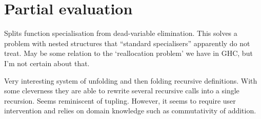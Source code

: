 \section{Partial evaluation}

Splits function specialisation from dead-variable elimination.
This solves a problem with nested structures that ``standard specialisers'' apparently do not treat.
May be some relation to the `reallocation problem' we have in GHC, but I'm not certain about that.



Very interesting system of unfolding and then folding recursive definitions.
With some cleverness they are able to rewrite several recursive calls into a single recursion.
Seems reminiscent of tupling.
However, it seems to require user intervention and relies on domain knowledge such as commutativity of addition.


